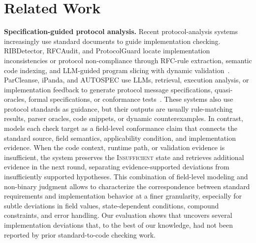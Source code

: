 \section{Related Work}
\label{sec:related}

\noindent \textbf{Specification-guided protocol analysis.}
Recent protocol-analysis systems increasingly use standard documents to guide
implementation checking. RIBDetector, RFCAudit, and ProtocolGuard locate
implementation inconsistencies or protocol non-compliance through RFC-rule
extraction, semantic code indexing, and LLM-guided program slicing with dynamic
validation~\cite{chen2022ribdetector,zheng2025rfcaudit,song2026protocolguard}.
ParCleanse, iPanda, and AUTOSPEC use LLMs, retrieval, execution analysis, or
implementation feedback to generate protocol message specifications,
quasi-oracles, formal specifications, or conformance
tests~\cite{zheng2025parcleanse,sun2025ipanda,liu2025autospec}. These systems
also use protocol standards as guidance, but their outputs are usually
rule-matching results, parser oracles, code snippets, or dynamic
counterexamples. In contrast, \tool{} models each check target as a field-level
conformance claim that connects the standard source, field semantics,
applicability condition, and implementation evidence. When the code context,
runtime path, or validation evidence is insufficient, the system preserves the
\textsc{Insufficient} state and retrieves additional evidence in the next
round, separating evidence-supported deviations from insufficiently supported
hypotheses. This combination of field-level modeling and non-binary judgment
allows \tool{} to characterize the correspondence between standard requirements
and implementation behavior at a finer granularity, especially for subtle
deviations in field values, state-dependent conditions, compound constraints,
and error handling. Our evaluation shows that \tool{} uncovers several
implementation deviations that, to the best of our knowledge, had not been
reported by prior standard-to-code checking work.


